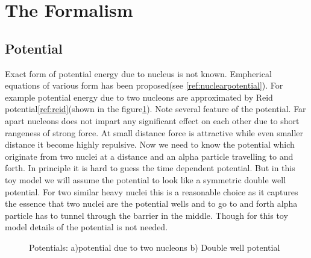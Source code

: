 \documentclass[a4paper,two column]{article}
\begin{document}
        \section{The Formalism}\label{sec:formalism}
            \subsection{Potential}\label{subsec:potential}
                Exact form of potential energy due to nucleus is not known. Empherical equations of various form has been proposed(see \ref{ref:nuclearpotential}). For example potential energy due to two nucleons are approximated by Reid potential\ref{ref:reid}(shown in the figure\ref{fig:reidpotential}). Note several feature of the potential. Far apart nucleons does not impart any significant effect on each other due to short rangeness of strong force. At small distance force is attractive while even smaller distance it become highly repulsive. Now we need to know the potential which originate from two nuclei at a distance and an alpha particle travelling to and forth. In principle it is hard to guess the time dependent potential. But in this toy model we will assume the potential to look like a symmetric double well potential. For two similar heavy nuclei this is a reasonable choice as it captures the essence that two nuclei are the potential wells and to go to and forth alpha particle has to tunnel through the barrier in the middle. Though for this toy model details of the potential is not needed.
                \begin{figure}[H]
                    \centering
                    \qquad
                    \caption{Potentials: a)potential due to two nucleons b) Double well potential}
                    \label{fig:reidpotential}
                \end{figure}
\end{document}
